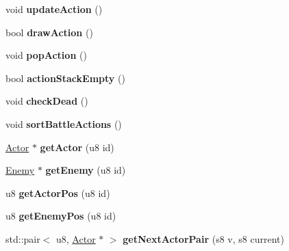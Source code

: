 \begin{DoxyCompactItemize}
\item 
\hypertarget{classBattle_a5ee8750acd3f8f3b1cf0c4423cb67eb5}{void {\bfseries update\-Action} ()}\label{classBattle_a5ee8750acd3f8f3b1cf0c4423cb67eb5}

\item 
\hypertarget{classBattle_a0ed5e501d9a58266cd17b6d611a494fb}{bool {\bfseries draw\-Action} ()}\label{classBattle_a0ed5e501d9a58266cd17b6d611a494fb}

\item 
\hypertarget{classBattle_a3e0bd6a620253948e430ec53b4f04672}{void {\bfseries pop\-Action} ()}\label{classBattle_a3e0bd6a620253948e430ec53b4f04672}

\item 
\hypertarget{classBattle_ad35eb3ff6846f7965abf6fe0b3db2f96}{bool {\bfseries action\-Stack\-Empty} ()}\label{classBattle_ad35eb3ff6846f7965abf6fe0b3db2f96}

\item 
\hypertarget{classBattle_a186a9ef5c51b9dbc2acc88e1ad032e02}{void {\bfseries check\-Dead} ()}\label{classBattle_a186a9ef5c51b9dbc2acc88e1ad032e02}

\item 
\hypertarget{classBattle_a45aa1b27b7a4151ed7101ac9a1e347d5}{void {\bfseries sort\-Battle\-Actions} ()}\label{classBattle_a45aa1b27b7a4151ed7101ac9a1e347d5}

\item 
\hypertarget{classBattle_a95cc7e1f4228d2adba39aa1664651c1f}{\hyperlink{classActor}{Actor} $\ast$ {\bfseries get\-Actor} (u8 id)}\label{classBattle_a95cc7e1f4228d2adba39aa1664651c1f}

\item 
\hypertarget{classBattle_ac7e10fe83e378adf7c3cdcfd2ea43287}{\hyperlink{classEnemy}{Enemy} $\ast$ {\bfseries get\-Enemy} (u8 id)}\label{classBattle_ac7e10fe83e378adf7c3cdcfd2ea43287}

\item 
\hypertarget{classBattle_afb01e330972bc83131fb5906d69bc706}{u8 {\bfseries get\-Actor\-Pos} (u8 id)}\label{classBattle_afb01e330972bc83131fb5906d69bc706}

\item 
\hypertarget{classBattle_a5ff82f19a80e8f97eff3beda6e18b9e7}{u8 {\bfseries get\-Enemy\-Pos} (u8 id)}\label{classBattle_a5ff82f19a80e8f97eff3beda6e18b9e7}

\item 
\hypertarget{classBattle_ae20d56d9d9a4c552e0c889c1734a8340}{std\-::pair$<$ u8, \hyperlink{classActor}{Actor} $\ast$ $>$ {\bfseries get\-Next\-Actor\-Pair} (s8 v, s8 current)}\label{classBattle_ae20d56d9d9a4c552e0c889c1734a8340}


\end{DoxyCompactItemize}
